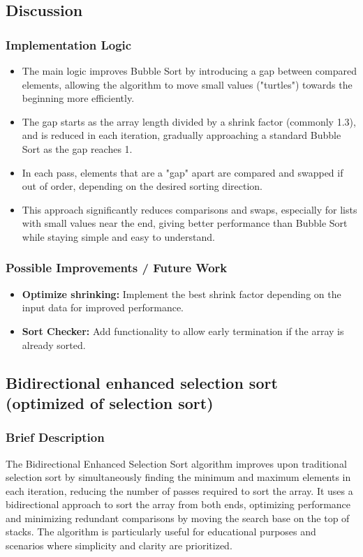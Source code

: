 \documentclass{article}
\begin{document}

\subsection*{Discussion}
\subsubsection*{Implementation Logic}
\begin{itemize}
    \item The main logic improves Bubble Sort by introducing a gap between compared elements, allowing the algorithm to move small values ("turtles") towards the beginning more efficiently.
    
    \item The gap starts as the array length divided by a shrink factor (commonly 1.3), and is reduced in each iteration, gradually approaching a standard Bubble Sort as the gap reaches 1.
    
    \item In each pass, elements that are a "gap" apart are compared and swapped if out of order, depending on the desired sorting direction.
    
    \item This approach significantly reduces comparisons and swaps, especially for lists with small values near the end, giving better performance than Bubble Sort while staying simple and easy to understand.
\end{itemize}
\subsubsection*{Possible Improvements / Future Work}
\begin{itemize}
    \item \textbf{Optimize shrinking:} Implement the best shrink factor depending on the input data for improved performance.
    \item \textbf{Sort Checker:} Add functionality to allow early termination if the array is already sorted.
\end{itemize}


\subsection{Bidirectional enhanced selection sort (optimized of selection sort)}
\subsubsection*{Brief Description}
The Bidirectional Enhanced Selection Sort algorithm improves upon traditional selection sort by simultaneously finding the minimum and maximum elements in each iteration, reducing the number of passes required to sort the array. It uses a bidirectional approach to sort the array from both ends, optimizing performance and minimizing redundant comparisons by moving the search base on the top of stacks. The algorithm is particularly useful for educational purposes and scenarios where simplicity and clarity are prioritized.
\end{document}
